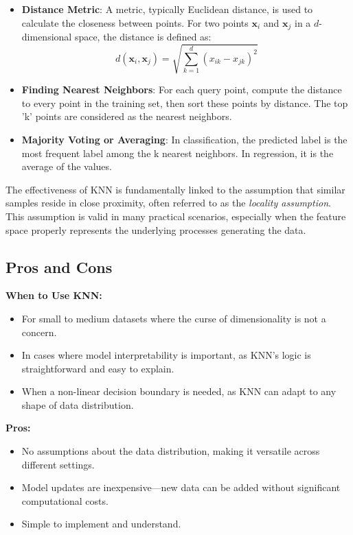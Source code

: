 \documentclass[12pt]{article}
\begin{document}
\begin{itemize}
    \item \textbf{Distance Metric}: A metric, typically Euclidean distance, is used to calculate the closeness between points. For two points \(\mathbf{x}_i\) and \(\mathbf{x}_j\) in a \(d\)-dimensional space, the distance is defined as:
    \[
    d(\mathbf{x}_i, \mathbf{x}_j) = \sqrt{\sum_{k=1}^d (x_{ik} - x_{jk})^2}
    \]
    \item \textbf{Finding Nearest Neighbors}: For each query point, compute the distance to every point in the training set, then sort these points by distance. The top 'k' points are considered as the nearest neighbors.
    \item \textbf{Majority Voting or Averaging}: In classification, the predicted label is the most frequent label among the k nearest neighbors. In regression, it is the average of the values.
\end{itemize}

The effectiveness of KNN is fundamentally linked to the assumption that similar samples reside in close proximity, often referred to as the \textit{locality assumption}. This assumption is valid in many practical scenarios, especially when the feature space properly represents the underlying processes generating the data.

\subsection{Pros and Cons}

\textbf{When to Use KNN:}
\begin{itemize}
    \item For small to medium datasets where the curse of dimensionality is not a concern.
    \item In cases where model interpretability is important, as KNN's logic is straightforward and easy to explain.
    \item When a non-linear decision boundary is needed, as KNN can adapt to any shape of data distribution.
\end{itemize}

\textbf{Pros:}
\begin{itemize}
    \item No assumptions about the data distribution, making it versatile across different settings.
    \item Model updates are inexpensive—new data can be added without significant computational costs.
    \item Simple to implement and understand.
\end{itemize}
\end{document}
